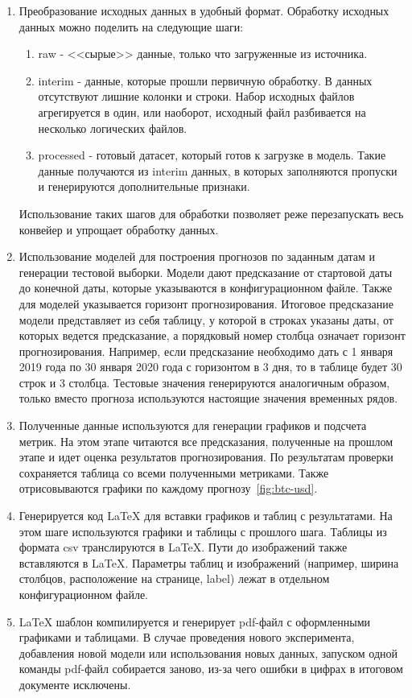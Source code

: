 \documentclass[a4paper,article,14pt]{extarticle}
\begin{document}
\begin{enumerate}
     данные через API Yahoo finance по интересующим тикерам (котировкам) за указанный временной интервал.
    Для работы с API Yahoo finance используется python-библиотека yfinance.

    \item Преобразование исходных данных в удобный формат.
Обработку исходных данных можно поделить на следующие шаги:

    \begin{enumerate}
        \item raw - <<сырые>> данные, только что загруженные из источника.
        \item interim - данные, которые прошли первичную обработку.
    В данных отсутствуют лишние колонки и строки.
    Набор исходных файлов агрегируется в один, или наоборот, исходный файл разбивается на несколько логических файлов.
        \item processed - готовый датасет, который готов к загрузке в модель.
    Такие данные получаются из interim данных, в которых заполняются пропуски и генерируются дополнительные признаки.
    \end{enumerate}
    Использование таких шагов для обработки позволяет реже перезапускать весь конвейер и упрощает обработку данных.
    \item Использование моделей для построения прогнозов по заданным датам и генерации тестовой выборки.
Модели дают предсказание от стартовой даты до конечной даты, которые указываются в конфигурационном файле.
Также для моделей указывается горизонт прогнозирования.
Итоговое предсказание модели представляет из себя таблицу, у которой в строках указаны даты, от которых ведется предсказание, а порядковый номер столбца означает горизонт прогнозирования.
Например, если предсказание необходимо дать с 1 января 2019 года по 30 января 2020 года с горизонтом в 3 дня, то в таблице будет 30 строк и 3 столбца.
Тестовые значения генерируются аналогичным образом, только вместо прогноза используются настоящие значения временных рядов.
    \item Полученные данные используются для генерации графиков и подсчета метрик.
На этом этапе читаются все предсказания, полученные на прошлом этапе и идет оценка результатов прогнозирования.
По результатам проверки сохраняется таблица со всеми полученными метриками.
Также отрисовываются графики по каждому прогнозу~\ref{fig:btc-usd}.
    \item Генерируется код LaTeX для вставки графиков и таблиц с результатами.
На этом шаге используются графики и таблицы с прошлого шага.
Таблицы из формата csv транслируются в LaTeX\@.
Пути до изображений также вставляются в LaTeX\@.
Параметры таблиц и изображений (например, ширина столбцов, расположение на странице, label) лежат в отдельном конфигурационном файле.
    \item LaTeX шаблон компилируется и генерирует pdf-файл с оформленными графиками и таблицами.
В случае проведения нового эксперимента, добавления новой модели или использования новых данных, запуском одной команды pdf-файл собирается заново, из-за чего ошибки в цифрах в итоговом документе исключены.
\end{enumerate}
\end{document}
